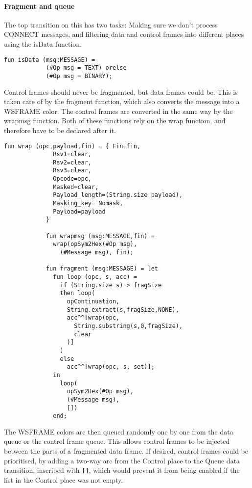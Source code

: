		\paragraph{Fragment and queue}
			
			
			The top transition on this has two tasks: Making sure we don't process
			CONNECT messages, and filtering data and control frames into different
			places using the isData function. 
			
			\begin{lstlisting}[label=lst:isData,caption=isData,gobble=3]
			fun isData (msg:MESSAGE) =
			(#Op msg = TEXT) orelse
			(#Op msg = BINARY);
			\end{lstlisting}
			
			Control frames should never be fragmented, but data frames could be. This is
			taken care of by the fragment function, which also converts the message into
			a WSFRAME color. The control frames are converted in the same way by the
			wrapmsg function. Both of these functions rely on the wrap function, and
			therefore have to be declared after it.
			
			
			\begin{lstlisting}[label=lst:fragment,caption=wrap wrapmsg and
			fragment,gobble=3]
			fun wrap (opc,payload,fin) = { Fin=fin,
			  Rsv1=clear,
			  Rsv2=clear,
			  Rsv3=clear,
			  Opcode=opc,
			  Masked=clear,
			  Payload_length=(String.size payload),
			  Masking_key= Nomask,
			  Payload=payload
			}
			
			fun wrapmsg (msg:MESSAGE,fin) = 
			  wrap(opSym2Hex(#Op msg), 
			    (#Message msg), fin);
			    
			fun fragment (msg:MESSAGE) = let
			  fun loop (opc, s, acc) = 
			    if (String.size s) > fragSize
			    then loop(
			      opContinuation,
			      String.extract(s,fragSize,NONE),
			      acc^^[wrap(opc, 
			        String.substring(s,0,fragSize), 
			        clear
			      )]
			    )
			    else 
			      acc^^[wrap(opc, s, set)];
			  in 
			    loop(
			      opSym2Hex(#Op msg), 
			      (#Message msg), 
			      [])
			  end;
			\end{lstlisting}
			
			The WSFRAME colors are then queued randomly one by one from the data queue or
			the control frame queue. This allows control frames to be injected between
			the parts of a fragmented data frame. If desired, control frames could be
			prioritised, by adding a two-way arc from the Control place to the Queue data
			transition, inscribed with \lstinline:[]:, which would prevent it from being
			enabled if the list in the Control place was not empty.
		
